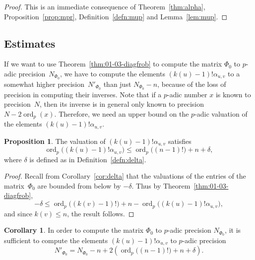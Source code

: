 \documentclass[a4paper,11pt]{article}
\numberwithin{equation}{section}
\DeclareMathOperator{\ord}{ord}          %
\theoremstyle{definition}
\newtheorem{prop}[thm]{Proposition}
\newtheorem{cor}[thm]{Corollary}
\begin{document}
\begin{proof}
This is an immediate consequence of Theorem~\ref{thm:alpha}, 
Proposition~\ref{prop:mpr}, Definition~\ref{defn:mup} and 
Lemma~\ref{lem:mup}.
\end{proof}

\subsection{Estimates}

If we want to use Theorem~\ref{thm:01-03-diagfrob} to compute the matrix 
$\Phi_0$ to $p$-adic precision~$N_{\Phi_0}$, we have to compute the elements
$(k(u)-1)!\alpha_{u,v}$ to a somewhat higher precision~$N'_{\Phi_0}$ than just
$N_{\Phi_0}-n$, because of the loss of precision in computing their inverses. Note 
that if a $p$-adic number $x$ is known to precision~$N$, then its inverse 
is in general only known to precision $N-2\ord_p(x)$. Therefore, we need an 
upper bound on the $p$-adic valuation of the elements $(k(u)-1)!\alpha_{u,v}$.

\begin{prop}
The valuation of $(k(u)-1)! \alpha_{u,v}$ satisfies
\begin{equation*}
\ord_p\bigl((k(u)-1)! \alpha_{u,v}\bigr) 
    \leq \ord_p\bigl((n-1)!\bigr) + n + \delta,
\end{equation*}
where $\delta$ is defined as in Definition~\ref{defn:delta}. 
\end{prop}

\begin{proof}
Recall from Corollary~\ref{cor:delta} that the valuations 
of the entries of the matrix~$\Phi_0$ are bounded from below by $-\delta$. 
Thus by Theorem~\ref{thm:01-03-diagfrob}, 
\begin{equation*}
-\delta \leq \ord_p\bigl((k(v)-1)!\bigr) + n 
           - \ord_p\bigl((k(u)-1)! \alpha_{u,v}\bigr),
\end{equation*}
and since $k(v) \leq n$, the result follows.
\end{proof}

\begin{cor} \label{cor:Ntilde}
In order to compute the matrix $\Phi_0$ to $p$-adic precision $N_{\Phi_0}$, 
it is sufficient to compute the elements $(k(u)-1)!\alpha_{u,v}$ to $p$-adic 
precision
\begin{equation*}
N'_{\Phi_0}=N_{\Phi_0}-n+2(\ord_p\bigl((n-1)!\bigr)+n+\delta).
\end{equation*}
\end{cor}
\end{document}
